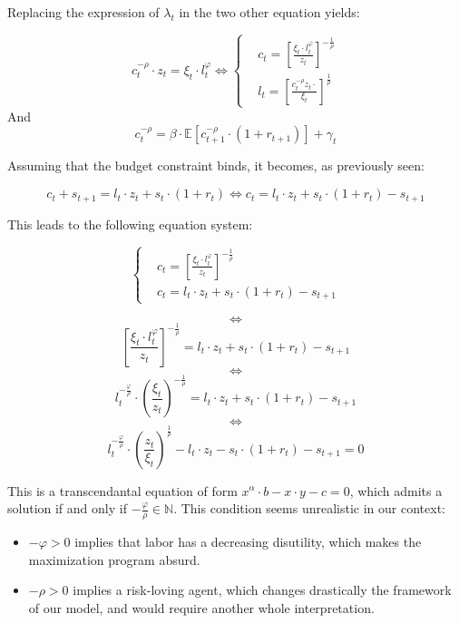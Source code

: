 \documentclass{article}
\begin{document}
Replacing the expression of $\lambda_{t}$ in the two other equation yields: 

\begin{equation}
    c^{-\rho}_{t}\cdot z_{t} = \xi_{t}\cdot l_{t}^{\varphi} \iff
        \begin{cases}
        & c_t = \left[\frac{\xi_{t}\cdot l_{t}^{\varphi}}{z_{t}}\right]^{-\frac{1}{\rho}}\\ 
        & l_{t} = \left[\frac{c_{t}^{-\rho}z_{t}\cdot}{\xi_{t}}\right]^{\frac{1}{\rho}}
    \end{cases}
\end{equation}
And 
\begin{equation}
    c^{-\rho}_{t} = \beta \cdot \mathbb{E}\left[c^{-\rho}_{t+1}\cdot (1+r_{t+1})\right] + \gamma_{t}
\end{equation}

Assuming that the budget constraint binds, it becomes, as previously seen:

$$c_{t} + s_{t+1} = l_{t}\cdot z_{t} + s_{t}\cdot(1+r_{t})
\iff 
c_{t} = l_{t}\cdot z_{t} + s_{t}\cdot(1+r_{t}) - s_{t+1} 
$$

This leads to the following equation system: 

$$
\begin{cases}
    & c_t = \left[\frac{\xi_{t}\cdot l_{t}^{\varphi}}{z_{t}}\right]^{-\frac{1}{\rho}} \\
    & c_{t} = l_{t}\cdot z_{t} + s_{t}\cdot(1+r_{t}) - s_{t+1} 
\end{cases}
$$

$$\iff$$
$$ \left[\frac{\xi_{t}\cdot l_{t}^{\varphi}}{z_{t}}\right]^{-\frac{1}{\rho}} = l_{t}\cdot z_{t} + s_{t}\cdot(1+r_{t}) - s_{t+1} $$
$$\iff$$
$$ l_{t}^{-\frac{\varphi}{\rho}} \cdot \left(\frac{\xi_{t}}{z_{t}}\right)^{-\frac{1}{\rho}} = l_{t}\cdot z_{t} + s_{t}\cdot(1+r_{t}) - s_{t+1} $$
$$\iff$$
$$ l_{t}^{-\frac{\varphi}{\rho}} \cdot \left(\frac{z_{t}}{\xi_{t}}\right)^{\frac{1}{\rho}} - l_{t}\cdot z_{t} - s_{t}\cdot(1+r_{t}) - s_{t+1} = 0 $$

This is a transcendantal equation of form 
$x^{\alpha}\cdot b - x\cdot y - c = 0$,
which admits a solution if and only if $-\frac{\varphi}{\rho} \in \mathbb{N}$.
This condition seems unrealistic in our context: 

\begin{itemize}
    \item $-\varphi >0$ implies that labor has a decreasing disutility,
    which makes the maximization program absurd.
    \item $-\rho >0$ implies a risk-loving agent, which changes 
    drastically the framework of our model, and would require another whole 
    interpretation.
\end{itemize}
\end{document}
